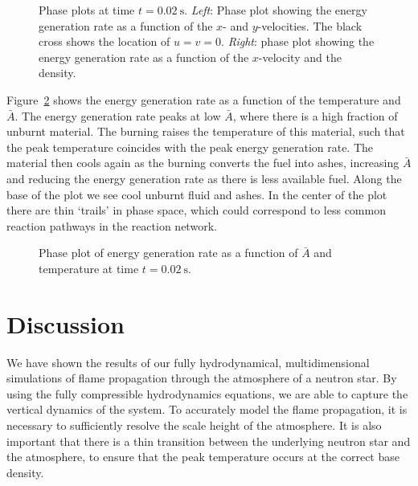 \documentclass[preprint,times,tighten]{aastex63}
\begin{document}
\begin{figure}[t]
\centering
{}
\caption{\label{fig:phase_plots} Phase plots at time $t = 0.02~\mathrm{s}$.
\emph{Left}: Phase plot showing the energy generation rate as a function of
the $x$- and $y$-velocities. The black cross shows the location of $u = v = 0$. \emph{Right}: phase plot showing the energy
generation rate as a function of the $x$-velocity and the density.}
\end{figure}

Figure~\ref{fig:abar_temp} shows the energy generation rate as a function of the
temperature and $\bar{A}$. 
The energy generation rate peaks at low $\bar{A}$, where there is a high fraction
of unburnt material. The burning raises the temperature of this material, such
that the peak temperature coincides with the peak energy generation rate. The
material then cools again as the burning converts the fuel into ashes,
increasing $\bar{A}$ and reducing the energy generation rate as there is
less available fuel. Along the base of the plot we see cool unburnt fluid and
ashes. In the center of the plot there are thin `trails' in phase space, which
could correspond to less common reaction pathways in the reaction network.

\begin{figure}[t]
\centering
{}
\caption{\label{fig:abar_temp} Phase plot of energy generation rate as a function of $\bar{A}$ and temperature at time $t = 0.02~\mathrm{s}$.}
\end{figure}


\section{Discussion}

We have shown the results of our fully hydrodynamical,
multidimensional simulations of flame propagation through the
atmosphere of a neutron star. By using the fully compressible
hydrodynamics equations, we are able to capture the vertical dynamics
of the system. To accurately model the flame propagation, it is
necessary to sufficiently resolve the scale height of the
atmosphere. It is also important that there is a thin transition
between the underlying neutron star and the atmosphere, to ensure that
the peak temperature occurs at the correct base density.
\end{document}
